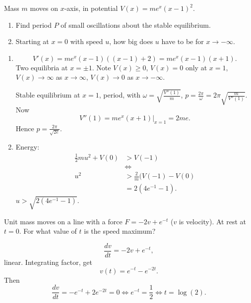 \documentclass[10pt, a4paper]{article}
\begin{document}
\begin{problem}[$2020$ exam]
    Mass $m$ moves on $x$-axis,
    in potential $V(x) = me ^ x(x - 1) ^ 2$.
    \begin{enumerate}[label = (\alph*)]
        \item Find period $P$ of small oscillations about the stable equilibrium.

        \item Starting at $x = 0$ with speed $u$,
        how big does $u$ have to be for $x \rightarrow -\infty$.
    \end{enumerate}

    \begin{solution}
        \begin{enumerate}[label = (\alph*)]
            \item
            \[
            V'(x) = me ^ x(x - 1)((x - 1) + 2) = me ^ x(x - 1)(x + 1).
            \]
            Two equilibria at $x = \pm 1$.
            Note $V(x) \geq 0$,
            $V(x) = 0$ only at $x = 1$,
            $V(x) \rightarrow \infty$ as $x \rightarrow \infty$,
            $V(x) \rightarrow 0$ as $x \rightarrow -\infty$.

            Stable equilibrium at $x = 1$,
            period,
            with $\omega = \sqrt{\frac{V''(1)}{m}}$,
            $p = \frac{2\pi}{\omega} = 2\pi\sqrt{\frac{m}{V''(1)}}$.
            Now
            \[
            V''(1) = me ^ x(x + 1)|_{x = 1} = 2me.
            \]
            Hence $p = \frac{2\pi}{\sqrt{2e}}$.

            \item Energy:
            \begin{align*}
                \frac{1}{2}mu ^ 2 + V(0) &> V(-1) \\
                &\iff \\
                u ^ 2 &> \frac{2}{m}(V(-1) - V(0) \\
                &= 2(4e ^ {-1} - 1).
            \end{align*}
            $u > \sqrt{2(4e ^ {-1} - 1)}$.
        \end{enumerate}
    \end{solution}
\end{problem}

\begin{problem}[$2022$ exam]
    Unit mass moves on a line with a force $F = -2v + e ^ {-t}$
    ($v$ is velocity).
    At rest at $t = 0$.
    For what value of $t$ is the speed maximum?

    \begin{solution}
        \[
        \frac{dv}{dt} = -2v + e ^ {-t},
        \]
        linear.
        Integrating factor,
        get
        \[
        v(t) = e ^ {-t} - e ^ {-2t}.
        \]
        Then
        \[
        \frac{dv}{dt} = -e ^ {-t} + 2e ^ {-2t} = 0 \iff e ^ {-t} = \frac{1}{2} \iff t = \log(2).
        \]
        
    \end{solution}
\end{problem}
\end{document}
